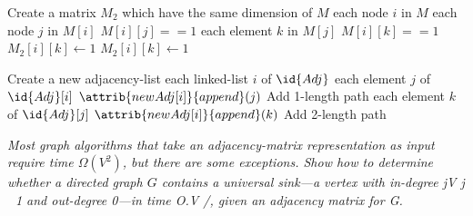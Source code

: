 \begin{description}
\begin{ex}
\begin{codebox}
\li Create a matrix $M_2$ which have the same dimension of $M$
\li \For each node $i$ in $M$ \Do
  \li \For each node $j$ in $M[i]$ \Do
    \li \If $M[i][j]==1$ \Then
      \li \For each element $k$ in $M[j]$ \Do
        \li \If $M[i][k] == 1$ \Then
          \li $M_2[i][k] \gets 1$ 
        \End
        \li $M_2[i][k] \gets 1$ 
      \End 
    \End 
  \End
\End
\end{codebox}

\begin{codebox}
\li Create a new adjacency-list 
\li \For each linked-list $i$ of $\id{Adj}$ \Do 
    \li \For each element $j$ of $\id{Adj}[i]$ \Do
        \li $\attrib{newAdj[i]}{append}(j)$ \Comment Add 1-length path
        \li \For each element $k$ of $\id{Adj}[j]$ \Do
            \li $\attrib{newAdj[i]}{append}(k)$ \Comment Add 2-length path
        \End
    \End
\end{codebox}
\end{ex}
 \textit{Most graph algorithms that take an adjacency-matrix representation as input require time $\Omega(V^2)$, but there are some exceptions. Show how to determine whether a directed graph $G$ contains a universal sink—a vertex with in-degree jV j  1 and out-degree 0—in time O.V /, given an adjacency matrix for G.}    
 \textit{}    
 \textit{}    


\end{description}
